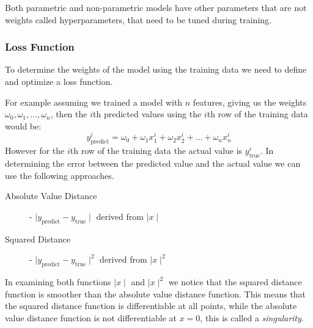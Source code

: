 \documentclass[12pt letter]{report}
\begin{document}

Both parametric and non-parametric models have other parameters that are not weights called hyperparameters, that need
to be tuned during training.


\subsubsection{Loss Function}

To determine the weights of the model using the training data we need to define and optimize a loss function.

For example assuming we trained a model with $n$ features, giving us the weights $\omega_0, \omega_1, \ldots,
  \omega_{n}$, then the $i$th predicted values using the $i$th row of the training data would be:
\[
  y^i_{\text{predict}} = \omega_0 + \omega_1 x^i_1 + \omega_2 x^i_2 + \ldots + \omega_n x^i_n
\]
However for the $i$th row of the training data the actual value is $y^i_{\text{true}}$. In determining the error between
the predicted value and the actual value we can use the following approaches.
\begin{description}
  \item[Absolute Value Distance] - $ \mid y_{\text{predict}} - y_{\text{true}} \mid $ derived from $ \mid x \mid $
  \item[Squared Distance] - $ \mid y_{\text{predict}} - y_{\text{true}} \mid^2 $ derived from $  \mid x \mid ^2 $
\end{description}

In examining both functions $ \mid x \mid $ and $ \mid x  \mid ^2$ we notice that the squared distance function is
smoother than the absolute value distance function. This means that the squared distance function is differentiable at
all points, while the absolute value distance function is not differentiable at $x=0$, this is called a
\textit{singularity}.
\end{document}
